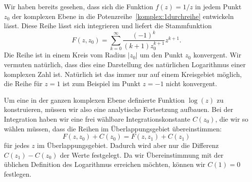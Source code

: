 \begin{beispiel}
Wir haben bereits gesehen, dass sich die Funktion $f(z)=1/z$ in jedem
Punkt $z_0$ der komplexen Ebene in die Potenzreihe~\eqref{komplex:1durchreihe}
entwickeln lässt.
Diese Reihe lässt sich integrieren und liefert die Stammfunktion
\[
F(z,z_0)
=
\sum_{k=0}^\infty\frac{(-1)^k}{(k+1)z_0^{k+1}}z^{k+1}.
\]
Die Reihe ist in einem Kreis vom Radius $|z_0|$ um den
Punkt $z_0$ konvergent.
Wir vermuten natürlich, dass dies eine Darstellung des natürlichen
Logarithmus einer komplexen Zahl ist.
Natürlich ist das immer nur auf einem Kreisgebiet möglich, die Reihe
für $z=1$ ist zum Beispiel im Punkt $z=-1$ nicht konvergent.

Um eine in der ganzen komplexen Ebene definierte Funktion $\log(z)$ zu
konstruieren, müssen wir also eine analytische Fortsetzung aufbauen.
Bei der Integration haben wir eine frei wählbare Integrationskonstante
$C(z_0)$, die wir so wählen müssen, dass die Reihen im Überlappungsgebiet
übereinstimmen:
\[
F(z,z_0) + C(z_0) = F(z,z_1)  + C(z_1)
\]
für jedes $z$ im Überlappungsgebiet.
Dadurch wird aber nur die Differenz $C(z_1)-C(z_0)$ der Werte festgelegt.
Da wir Übereinstimmung mit der üblichen Definition des Logarithmus
erreichen möchten, können wir $C(1)=0$ festlegen.


\end{beispiel}
